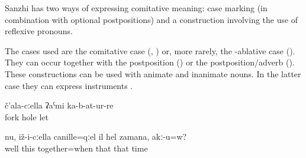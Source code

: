 Sanzhi has two ways of expressing comitative meaning: case marking (in combination with optional postpositions) and a construction involving the use of reflexive pronouns.

The cases used are the comitative case (, ) or, more rarely, the -ablative case (). They can occur together with the postposition  () or the postposition\slash adverb  (). These constructions can be used with animate and inanimate nouns. In the latter case they can express instruments .
%
\begin{exe}
	\ex	\label{ex:having made a hole with a fork}
	\gll	č'ala-cːella	ʡaˁmi	ka-b-at-ur-re\\
		fork	hole	let\\
	\glt	{}

	\ex	\label{ex:Well, he was together with him at that time, right}
	\gll	nu,	iž-i-cːella	canille=qːel	il	hel	zamana,	akː-u=w?\\
		well	this	together=when	that	that	time	\\
	\glt	{}
\end{exe}

